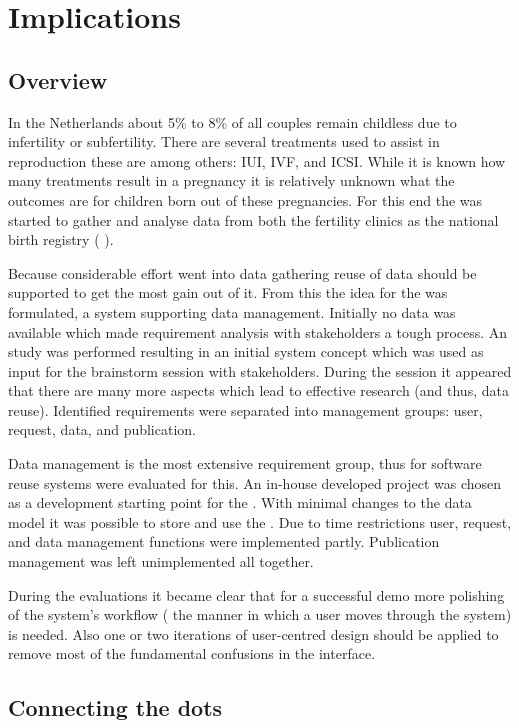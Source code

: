 \section{Implications}

\subsection{Overview}

In the Netherlands about 5\% to 8\% of all couples remain childless due to infertility or subfertility.
There are several treatments used to assist in reproduction these are among others: IUI, IVF, and ICSI.
While it is known how many treatments result in a pregnancy it is relatively unknown what the outcomes are for children born out of these pregnancies.
For this end the \project{} was started to gather and analyse data from both the fertility clinics as the national birth registry (\ie{} \PRN{}).

Because considerable effort went into data gathering reuse of data should be supported to get the most gain out of it.
From this the idea for the \ivfsystem{} was formulated, a system supporting data management.
Initially no data was available which made requirement analysis with stakeholders a tough process.
An study was performed resulting in an initial system concept which was used as input for the brainstorm session with stakeholders.
During the session it appeared that there are many more aspects which lead to effective research (and thus, data reuse).
Identified requirements were separated into management groups: user, request, data, and publication.

Data management is the most extensive requirement group, thus for software reuse systems were evaluated for this.
An in-house developed project was chosen as a development starting point for the \ivfsystem{}.
With minimal changes to the data model it was possible to store and use the \projectdata{}.
Due to time restrictions user, request, and data management functions were implemented partly.
Publication management was left unimplemented all together.

During the evaluations it became clear that for a successful demo more polishing of the system's workflow (\ie{} the manner in which a user moves through the system) is needed.
Also one or two iterations of user-centred design should be applied to remove most of the fundamental confusions in the interface.

\subsection{Connecting the dots}

